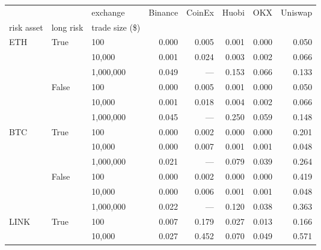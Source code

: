 \begin{tabular}{lllrrrrr}
    \toprule
                          &                        & exchange        & Binance & CoinEx & Huobi & OKX   & Uniswap \\
    risk asset            & long risk              & trade size (\$) &         &        &       &       &         \\
    \midrule
    \multirow{6}{*}{ETH}  & \multirow{3}{*}{True}  & 100             & 0.000   & 0.005  & 0.001 & 0.000 & 0.050   \\
                          &                        & 10,000          & 0.001   & 0.024  & 0.003 & 0.002 & 0.066   \\
                          &                        & 1,000,000       & 0.049   & ---    & 0.153 & 0.066 & 0.133   \\
    \cline{2-8}
                          & \multirow{3}{*}{False} & 100             & 0.000   & 0.005  & 0.001 & 0.000 & 0.050   \\
                          &                        & 10,000          & 0.001   & 0.018  & 0.004 & 0.002 & 0.066   \\
                          &                        & 1,000,000       & 0.045   & ---    & 0.250 & 0.059 & 0.148   \\
    \cline{1-8}
    \cline{2-8}
    \multirow{6}{*}{BTC}  & \multirow{3}{*}{True}  & 100             & 0.000   & 0.002  & 0.000 & 0.000 & 0.201   \\
                          &                        & 10,000          & 0.000   & 0.007  & 0.001 & 0.001 & 0.048   \\
                          &                        & 1,000,000       & 0.021   & ---    & 0.079 & 0.039 & 0.264   \\
    \cline{2-8}
                          & \multirow{3}{*}{False} & 100             & 0.000   & 0.002  & 0.000 & 0.000 & 0.419   \\
                          &                        & 10,000          & 0.000   & 0.006  & 0.001 & 0.001 & 0.048   \\
                          &                        & 1,000,000       & 0.022   & ---    & 0.120 & 0.038 & 0.363   \\
    \cline{1-8}
    \cline{2-8}
    \multirow{6}{*}{LINK} & \multirow{3}{*}{True}  & 100             & 0.007   & 0.179  & 0.027 & 0.013 & 0.166   \\
                          &                        & 10,000          & 0.027   & 0.452  & 0.070 & 0.049 & 0.571   \\

\end{tabular}
